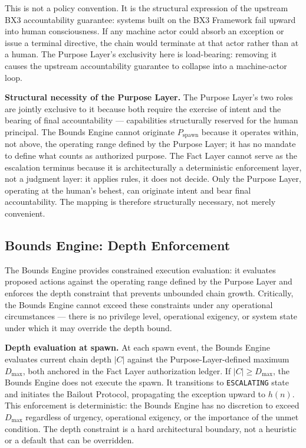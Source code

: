 This is not a policy convention. It is the structural expression of the upstream BX3 accountability guarantee: systems built on the BX3 Framework fail upward into human consciousness. If any machine actor could absorb an exception or issue a terminal directive, the chain would terminate at that actor rather than at a human. The Purpose Layer's exclusivity here is load-bearing: removing it causes the upstream accountability guarantee to collapse into a machine-actor loop.

\medskip
\noindent\textbf{Structural necessity of the Purpose Layer.} The Purpose Layer's two roles are jointly exclusive to it because both require the exercise of intent and the bearing of final accountability --- capabilities structurally reserved for the human principal. The Bounds Engine cannot originate $P_{\mathrm{spawn}}$ because it operates within, not above, the operating range defined by the Purpose Layer; it has no mandate to define what counts as authorized purpose. The Fact Layer cannot serve as the escalation terminus because it is architecturally a deterministic enforcement layer, not a judgment layer: it applies rules, it does not decide. Only the Purpose Layer, operating at the human's behest, can originate intent and bear final accountability. The mapping is therefore structurally necessary, not merely convenient.

\subsection{Bounds Engine: Depth Enforcement}
\label{sec:rs-bounds-depth}

The Bounds Engine provides constrained execution evaluation: it evaluates proposed actions against the operating range defined by the Purpose Layer and enforces the depth constraint that prevents unbounded chain growth. Critically, the Bounds Engine cannot exceed these constraints under any operational circumstances --- there is no privilege level, operational exigency, or system state under which it may override the depth bound.

\medskip
\noindent\textbf{Depth evaluation at spawn.} At each spawn event, the Bounds Engine evaluates current chain depth $|C|$ against the Purpose-Layer-defined maximum $D_{\mathrm{max}}$, both anchored in the Fact Layer authorization ledger. If $|C| \geq D_{\mathrm{max}}$, the Bounds Engine does not execute the spawn. It transitions to \texttt{ESCALATING} state and initiates the Bailout Protocol, propagating the exception upward to $h(n)$. This enforcement is deterministic: the Bounds Engine has no discretion to exceed $D_{\mathrm{max}}$ regardless of urgency, operational exigency, or the importance of the unmet condition. The depth constraint is a hard architectural boundary, not a heuristic or a default that can be overridden.

